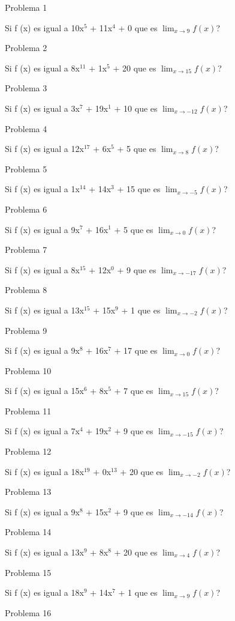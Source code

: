 \documentclass{article}
\begin{document}
Problema 1

Si f (x) es igual a 10x$^{5}$ +  11x${^4}$ + 0 que es $\lim_{x\to 9} f(x) $?

Problema 2

Si f (x) es igual a 8x$^{11}$ +  1x${^5}$ + 20 que es $\lim_{x\to 15} f(x) $?

Problema 3

Si f (x) es igual a 3x$^{7}$ +  19x${^1}$ + 10 que es $\lim_{x\to -12} f(x) $?

Problema 4

Si f (x) es igual a 12x$^{17}$ +  6x${^5}$ + 5 que es $\lim_{x\to 8} f(x) $?

Problema 5

Si f (x) es igual a 1x$^{14}$ +  14x${^3}$ + 15 que es $\lim_{x\to -5} f(x) $?

Problema 6

Si f (x) es igual a 9x$^{7}$ +  16x${^1}$ + 5 que es $\lim_{x\to 0} f(x) $?

Problema 7

Si f (x) es igual a 8x$^{15}$ +  12x${^0}$ + 9 que es $\lim_{x\to -17} f(x) $?

Problema 8

Si f (x) es igual a 13x$^{15}$ +  15x${^9}$ + 1 que es $\lim_{x\to -2} f(x) $?

Problema 9

Si f (x) es igual a 9x$^{8}$ +  16x${^7}$ + 17 que es $\lim_{x\to 0} f(x) $?

Problema 10

Si f (x) es igual a 15x$^{6}$ +  8x${^5}$ + 7 que es $\lim_{x\to 15} f(x) $?

Problema 11

Si f (x) es igual a 7x$^{4}$ +  19x${^2}$ + 9 que es $\lim_{x\to -15} f(x) $?

Problema 12

Si f (x) es igual a 18x$^{19}$ +  0x${^13}$ + 20 que es $\lim_{x\to -2} f(x) $?

Problema 13

Si f (x) es igual a 9x$^{8}$ +  15x${^2}$ + 9 que es $\lim_{x\to -14} f(x) $?

Problema 14

Si f (x) es igual a 13x$^{9}$ +  8x${^8}$ + 20 que es $\lim_{x\to 4} f(x) $?

Problema 15

Si f (x) es igual a 18x$^{9}$ +  14x${^7}$ + 1 que es $\lim_{x\to 9} f(x) $?

Problema 16
\end{document}
